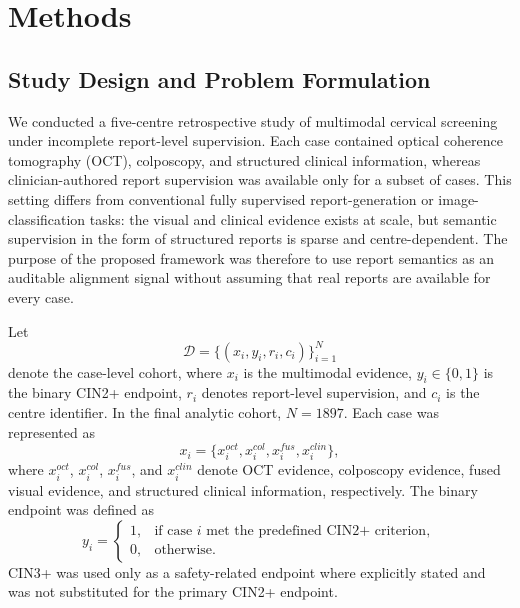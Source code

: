 \section{Methods}
\label{sec:methods}

\subsection{Study Design and Problem Formulation}
\label{subsec:methods_design}

We conducted a five-centre retrospective study of multimodal cervical screening under incomplete report-level supervision. Each case contained optical coherence tomography (OCT), colposcopy, and structured clinical information, whereas clinician-authored report supervision was available only for a subset of cases. This setting differs from conventional fully supervised report-generation or image-classification tasks: the visual and clinical evidence exists at scale, but semantic supervision in the form of structured reports is sparse and centre-dependent. The purpose of the proposed framework was therefore to use report semantics as an auditable alignment signal without assuming that real reports are available for every case.

Let
\begin{equation}
\mathcal{D}=\{(x_i,y_i,r_i,c_i)\}_{i=1}^{N}
\end{equation}
denote the case-level cohort, where \(x_i\) is the multimodal evidence, \(y_i\in\{0,1\}\) is the binary CIN2+ endpoint, \(r_i\) denotes report-level supervision, and \(c_i\) is the centre identifier. In the final analytic cohort, \(N=1897\). Each case was represented as
\begin{equation}
x_i=\{x_i^{oct},x_i^{col},x_i^{fus},x_i^{clin}\},
\end{equation}
where \(x_i^{oct}\), \(x_i^{col}\), \(x_i^{fus}\), and \(x_i^{clin}\) denote OCT evidence, colposcopy evidence, fused visual evidence, and structured clinical information, respectively. The binary endpoint was defined as
\begin{equation}
y_i=
\begin{cases}
1, & \text{if case }i\text{ met the predefined CIN2+ criterion},\\
0, & \text{otherwise}.
\end{cases}
\end{equation}
CIN3+ was used only as a safety-related endpoint where explicitly stated and was not substituted for the primary CIN2+ endpoint.

